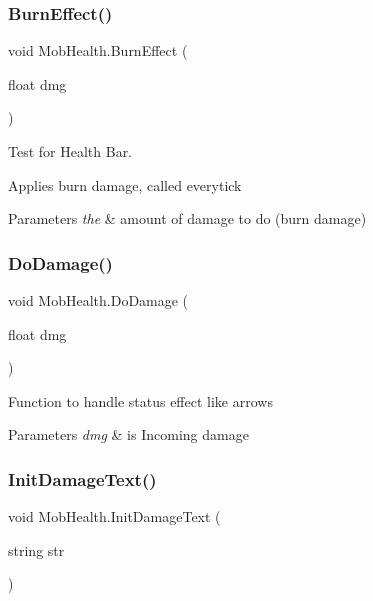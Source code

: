 \subsubsection{\texorpdfstring{Burn\+Effect()}{BurnEffect()}}
{\footnotesize\ttfamily void Mob\+Health.\+Burn\+Effect (\begin{DoxyParamCaption}\item[{float}]{dmg }\end{DoxyParamCaption})\hspace{0.3cm}{\ttfamily [private]}}



Test for Health Bar. 

Applies burn damage, called everytick 
\begin{DoxyParams}{Parameters}
{\em the} & amount of damage to do (burn damage) \\
\hline
\end{DoxyParams}
\mbox{\label{class_mob_health_adaf878419692a8b6a16f8f3861a6c74e}} 
\subsubsection{\texorpdfstring{Do\+Damage()}{DoDamage()}}
{\footnotesize\ttfamily void Mob\+Health.\+Do\+Damage (\begin{DoxyParamCaption}\item[{float}]{dmg }\end{DoxyParamCaption})}

Function to handle status effect like arrows 
\begin{DoxyParams}{Parameters}
{\em dmg} & is Incoming damage \\
\hline
\end{DoxyParams}
\mbox{\label{class_mob_health_a13e17984b18c95b8e6d56f52f9e11a71}} 
\subsubsection{\texorpdfstring{Init\+Damage\+Text()}{InitDamageText()}}
{\footnotesize\ttfamily void Mob\+Health.\+Init\+Damage\+Text (\begin{DoxyParamCaption}\item[{string}]{str }\end{DoxyParamCaption})\hspace{0.3cm}{\ttfamily [private]}}

